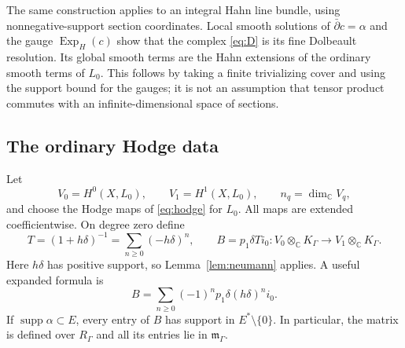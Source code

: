 \documentclass[11pt,letterpaper]{article}
\numberwithin{equation}{section}
\theoremstyle{definition}
\theoremstyle{remark}
\newcommand{\C}{\mathbb C}
\newcommand{\mm}{\mathfrak m}
\newcommand{\supp}{\operatorname{supp}}
\newcommand{\Exp}{\operatorname{Exp}_{H}}
\newcommand{\db}{\bar\partial}
\newcommand{\Kg}{K_\Gamma}
\newcommand{\rg}{R_\Gamma}
\newcommand{\mg}{\mm_\Gamma}
\newcommand{\ot}{\otimes_{\C}}
\begin{document}
The same construction applies to an integral Hahn line bundle, using
nonnegative-support section coordinates. Local smooth solutions of
$\db c=\alpha$ and the gauge $\Exp(c)$ show that the complex
\eqref{eq:D} is its fine Dolbeault resolution. Its global smooth terms
are the Hahn extensions of the ordinary smooth terms of $L_0$.
This follows by taking a finite trivializing cover and using the support
bound for the gauges; it is not an assumption that tensor product
commutes with an infinite-dimensional space of sections.

\subsection{The ordinary Hodge data}
Let
\[
 V_0=H^0(X,L_0),\qquad V_1=H^1(X,L_0),\qquad n_q=\dim_\C V_q,
\]
and choose the Hodge maps of \eqref{eq:hodge} for $L_0$.
All maps are extended coefficientwise. On degree zero define
\begin{equation}
 T=(1+h\delta)^{-1}=\sum_{n\ge0}(-h\delta)^n,
 \qquad
 B=p_1\delta T i_0:V_0\ot\Kg\longrightarrow V_1\ot\Kg.
 \label{eq:B}
\end{equation}
Here $h\delta$ has positive support, so Lemma~\ref{lem:neumann}
applies. A useful expanded formula is
\begin{equation}
 B=\sum_{n\ge0}(-1)^n p_1\delta(h\delta)^n i_0.
 \label{eq:Bexpanded}
\end{equation}
If $\supp\alpha\subset E$, every entry of $B$ has support in
$E^*\setminus\{0\}$. In particular, the matrix is defined over $\rg$
and all its entries lie in $\mg$.
\end{document}
